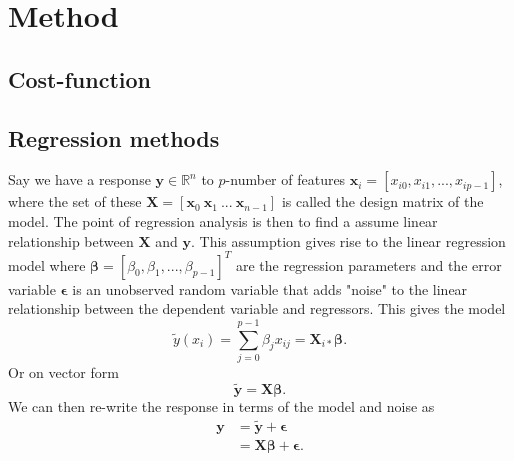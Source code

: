 \section{Method}
\begin{comment}
	Describe the methods and algorithms. You need to
	explain how you implemented the methods and also
	say something about the structure of your algorithm
	and present some parts of your code. You should
	plug in some calculations to demonstrate your code,
	such as selected runs used to validate and verify your
	results. The latter is extremely important! A reader
	needs to understand that your code reproduces selected
	benchmarks and reproduces previous results, either
	numerical and/or well-known closed form expressions.
\end{comment}

\subsection{Cost-function}


\subsection{Regression methods}
Say we have a response $\mathbf{y}\in\mathbb{R}^n$ to $p$-number of features $\mathbf{x}_i=[x_{i0}, x_{i1},...,x_{ip-1}]$,
where the set of these $\mathbf{X}=[\mathbf{x}_{0}\ \mathbf{x}_{1}\ ...\ \mathbf{x}_{n-1}]$ is called the design matrix of the model. 
The point of regression analysis is then to find a assume linear relationship between $\mathbf{X}$ and $\mathbf{y}$. 
This assumption gives rise to the linear regression model where $\boldsymbol\beta=\left[\beta_0, \beta_1, ..., \beta_{p-1} \right]^T$ 
are the regression parameters and the error variable $\boldsymbol\epsilon$ is an unobserved random variable that adds 
"noise" to the linear relationship between the dependent variable and regressors. This gives the model
\begin{equation*}
	\tilde{y}(x_i) = \sum_{j=0}^{p-1} \beta_j x_{ij}=\mathbf X_{i*}\boldsymbol{\beta}.
\end{equation*}
Or on vector form
\begin{equation*}
\boldsymbol{\tilde y} = \mathbf{X}\boldsymbol\beta.
\end{equation*}
We can then re-write the response in terms of the model and noise as
\begin{align*}
\label{eq:linear_regression}
    \mathbf{y} 
	&=\boldsymbol{\tilde y} + \boldsymbol{\epsilon}\\
	&=\mathbf{X}\boldsymbol{\beta} + \boldsymbol{\epsilon}.
\end{align*}




